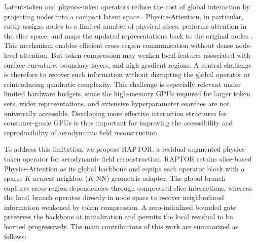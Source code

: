 \documentclass[a4paper,fleqn]{cas-sc}
\begin{document}
Latent-token and physics-token operators reduce the cost of global interaction by projecting nodes into a compact latent space \citep{ref19,ref20,ref23}. Physics-Attention, in particular, softly assigns nodes to a limited number of physical slices, performs attention in the slice space, and maps the updated representations back to the original nodes \citep{ref20}. This mechanism enables efficient cross-region communication without dense node-level attention. But token compression may weaken local features associated with surface curvature, boundary layers, and high-gradient regions. A central challenge is therefore to recover such information without disrupting the global operator or reintroducing quadratic complexity. This challenge is especially relevant under limited hardware budgets, since the high-memory GPUs required for larger token sets, wider representations, and extensive hyperparameter searches are not universally accessible. Developing more effective interaction structures for consumer-grade GPUs is thus important for improving the accessibility and reproducibility of aerodynamic field reconstruction.

To address this limitation, we propose RAPTOR, a residual-augmented physics-token operator for aerodynamic field reconstruction. RAPTOR retains slice-based Physics-Attention as its global backbone and equips each operator block with a sparse \(K\)-nearest-neighbor (\(K\)-NN) geometric adapter. The global branch captures cross-region dependencies through compressed slice interactions, whereas the local branch operates directly in node space to recover neighborhood information weakened by token compression. A zero-initialized bounded gate preserves the backbone at initialization and permits the local residual to be learned progressively.
The main contributions of this work are summarized as follows:
\end{document}
